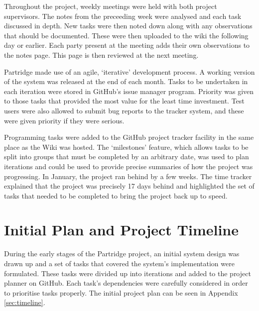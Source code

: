 Throughout the project, weekly meetings were held with both project
supervisors. The notes from the preceeding week were analysed and each task
discussed in depth. New tasks were then noted down along with any observations
that should be documented. These were then uploaded to the wiki the following
day or earlier. Each party present at the meeting adds their own observations
to the notes page. This page is then reviewed at the next meeting.

Partridge made use of an agile, `iterative' development process. A working
version of the system was released at the end of each month. Tasks to be
undertaken in each iteration were stored in GitHub's issue manager program.
Priority was given to those tasks that provided the most value for the least
time investment. Test users were also allowed to submit bug reports to the
tracker system, and these were given priority if they were serious.

Programming tasks were added to the GitHub project tracker facility in the
same place as the Wiki was hosted. The `milestones' feature, which allows tasks
to be split into groups that must be completed by an arbitrary date, was used
to plan iterations and could be used to provide precise summaries of how the
project was progressing. In January, the project ran behind by a few weeks.
The time tracker explained that the project was precisely 17 days behind and
highlighted the set of tasks that needed to be completed to bring the project
back up to speed.

\section{ Initial Plan and Project Timeline }

During the early stages of the Partridge project, an initial system design was
drawn up and a set of tasks that covered the system's implementation were
formulated. These tasks were divided up into iterations and added to the
project planner on GitHub. Each task's dependencies were carefully considered
in order to prioritise tasks properly. The initial project plan can be seen in
Appendix \ref{sec:timeline}. 
